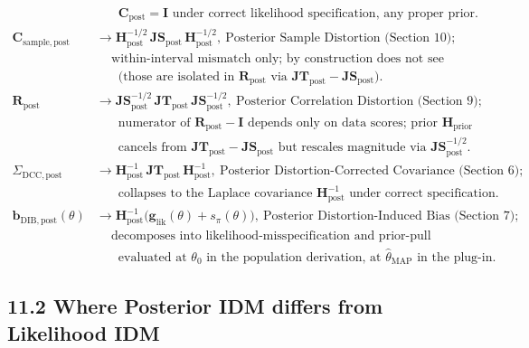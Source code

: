 \documentclass[11pt]{article}
\begin{document}
\begin{align*}
&\phantom{\rightarrow}\ \mathbf C_{\mathrm{post}} = \mathbf I \text{ under correct likelihood specification, any proper prior.}\\
\mathbf C_{\mathrm{sample},\mathrm{post}}
&\rightarrow
\mathbf H_{\mathrm{post}}^{-1/2}\, \mathbf{JS}_{\mathrm{post}}\, \mathbf H_{\mathrm{post}}^{-1/2},\ \text{Posterior Sample Distortion (Section~10);}\\
&\phantom{\rightarrow}\ \text{within-interval mismatch only; by construction does not see cross-interval terms}\\
&\phantom{\rightarrow}\ \text{(those are isolated in } \mathbf R_{\mathrm{post}} \text{ via } \mathbf{JT}_{\mathrm{post}} - \mathbf{JS}_{\mathrm{post}}\text{).}\\
\mathbf R_{\mathrm{post}}
&\rightarrow
\mathbf{JS}_{\mathrm{post}}^{-1/2}\, \mathbf{JT}_{\mathrm{post}}\, \mathbf{JS}_{\mathrm{post}}^{-1/2},\ \text{Posterior Correlation Distortion (Section~9);}\\
&\phantom{\rightarrow}\ \text{numerator of } \mathbf R_{\mathrm{post}} - \mathbf I \text{ depends only on data scores; prior } \mathbf H_{\mathrm{prior}}\\
&\phantom{\rightarrow}\ \text{cancels from } \mathbf{JT}_{\mathrm{post}} - \mathbf{JS}_{\mathrm{post}} \text{ but rescales magnitude via } \mathbf{JS}_{\mathrm{post}}^{-1/2}.\\
\Sigma_{\mathrm{DCC},\mathrm{post}}
&\rightarrow
\mathbf H_{\mathrm{post}}^{-1}\, \mathbf{JT}_{\mathrm{post}}\, \mathbf H_{\mathrm{post}}^{-1},\ \text{Posterior Distortion-Corrected Covariance (Section~6);}\\
&\phantom{\rightarrow}\ \text{collapses to the Laplace covariance } \mathbf H_{\mathrm{post}}^{-1} \text{ under correct specification.}\\
\mathbf b_{\mathrm{DIB},\mathrm{post}}(\theta)
&\rightarrow
\mathbf H_{\mathrm{post}}^{-1}\bigl(\mathbf g_{\mathrm{lik}}(\theta) + s_\pi(\theta)\bigr),\ \text{Posterior Distortion-Induced Bias (Section~7);}\\
&\phantom{\rightarrow}\ \text{decomposes into likelihood-misspecification and prior-pull components;}\\
&\phantom{\rightarrow}\ \text{evaluated at } \theta_0 \text{ in the population derivation, at } \widehat\theta_{\mathrm{MAP}} \text{ in the plug-in.}
\end{align*}

\subsection*{11.2 Where Posterior IDM differs from Likelihood IDM}
\end{document}
